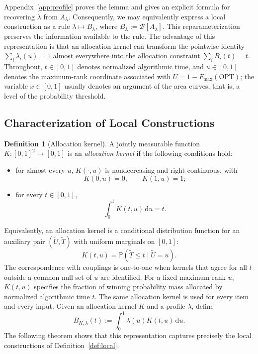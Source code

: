 \documentclass[11pt]{article}
\theoremstyle{definition}
\newtheorem{definition}[theorem]{Definition}
\theoremstyle{remark}
\newcommand{\Pp}{\mathbb P}
\newcommand{\dd}{\,\mathrm d}
\newcommand{\OPT}{\mathrm{OPT}}
\begin{document}
Appendix~\ref{app:profile} proves the lemma and gives an explicit formula for recovering $\lambda$ from $A_\lambda$.
Consequently, we may equivalently express a local construction as a rule $\lambda\mapsto B_\lambda$, where $B_\lambda:=\mathcal B[A_\lambda]$.
This reparameterization preserves the information available to the rule.
The advantage of this representation is that an allocation kernel can transform the pointwise identity $\sum_i\lambda_i(u)=1$ almost everywhere into the allocation constraint $\sum_iB_i(t)=t$.
Throughout, $t\in[0,1]$ denotes normalized algorithmic time, and $u\in[0,1]$ denotes the maximum-rank coordinate associated with $U=1-F_{\max}(\OPT)$; the variable $x\in[0,1]$ usually denotes an argument of the area curves, that is, a level of the probability threshold.

\subsection{Characterization of Local Constructions}\label{sec:characterization}

\begin{definition}[Allocation kernel]
A jointly measurable function $K:[0,1]^2\to[0,1]$ is an \emph{allocation kernel} if the following conditions hold:
\begin{itemize}
\item for almost every $u$, $K(\cdot,u)$ is nondecreasing and right-continuous, with
\[
 K(0,u)=0,
 \qquad K(1,u)=1;
\]
\item for every $t\in[0,1]$,
\begin{equation}\label{eq:kernel-marginal}
 \int_0^1K(t,u)\dd u=t.
\end{equation}
\end{itemize}
\end{definition}
Equivalently, an allocation kernel is a conditional distribution function for an auxiliary pair $(\widetilde U,\widetilde T)$ with uniform marginals on $[0,1]$:
\[
 K(t,u)=\Pp(\widetilde T\le t\mid\widetilde U=u).
\]
The correspondence with couplings is one-to-one when kernels that agree for all $t$ outside a common null set of $u$ are identified.
For a fixed maximum rank $u$, $K(t,u)$ specifies the fraction of winning probability mass allocated by normalized algorithmic time $t$.
The same allocation kernel is used for every item and every input.
Given an allocation kernel $K$ and a profile $\lambda$, define
\begin{equation}\label{eq:kernel-B}
 B_{K,\lambda}(t):=\int_0^1\lambda(u)K(t,u)\dd u.
\end{equation}
The following theorem shows that this representation captures precisely the local constructions of Definition~\ref{def:local}.
\end{document}
